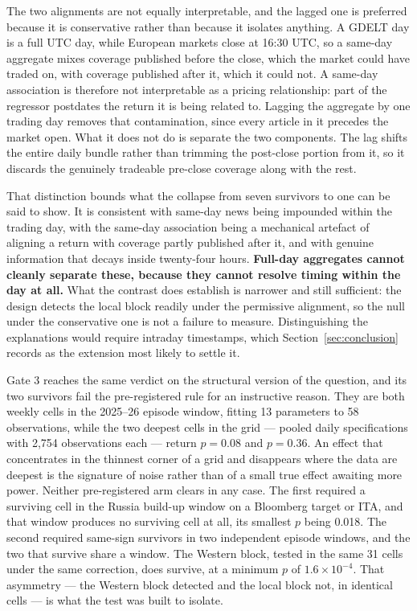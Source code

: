 \documentclass[12pt,a4paper]{article}
\begin{document}
The two alignments are not equally interpretable, and the lagged one is preferred because it is conservative rather than because it isolates anything. A GDELT day is a full UTC day, while European markets close at 16:30 UTC, so a same-day aggregate mixes coverage published before the close, which the market could have traded on, with coverage published after it, which it could not. A same-day association is therefore not interpretable as a pricing relationship: part of the regressor postdates the return it is being related to. Lagging the aggregate by one trading day removes that contamination, since every article in it precedes the market open. What it does not do is separate the two components. The lag shifts the entire daily bundle rather than trimming the post-close portion from it, so it discards the genuinely tradeable pre-close coverage along with the rest.

That distinction bounds what the collapse from seven survivors to one can be said to show. It is consistent with same-day news being impounded within the trading day, with the same-day association being a mechanical artefact of aligning a return with coverage partly published after it, and with genuine information that decays inside twenty-four hours. \textbf{Full-day aggregates cannot cleanly separate these, because they cannot resolve timing within the day at all.} What the contrast does establish is narrower and still sufficient: the design detects the local block readily under the permissive alignment, so the null under the conservative one is not a failure to measure. Distinguishing the explanations would require intraday timestamps, which Section~\ref{sec:conclusion} records as the extension most likely to settle it.

Gate 3 reaches the same verdict on the structural version of the question, and its two survivors fail the pre-registered rule for an instructive reason. They are both weekly cells in the 2025--26 episode window, fitting 13 parameters to 58 observations, while the two deepest cells in the grid --- pooled daily specifications with 2,754 observations each --- return $p = 0.08$ and $p = 0.36$. An effect that concentrates in the thinnest corner of a grid and disappears where the data are deepest is the signature of noise rather than of a small true effect awaiting more power. Neither pre-registered arm clears in any case. The first required a surviving cell in the Russia build-up window on a Bloomberg target or ITA, and that window produces no surviving cell at all, its smallest $p$ being 0.018. The second required same-sign survivors in two independent episode windows, and the two that survive share a window. The Western block, tested in the same 31 cells under the same correction, does survive, at a minimum $p$ of $1.6\times10^{-4}$. That asymmetry --- the Western block detected and the local block not, in identical cells --- is what the test was built to isolate.
\end{document}
